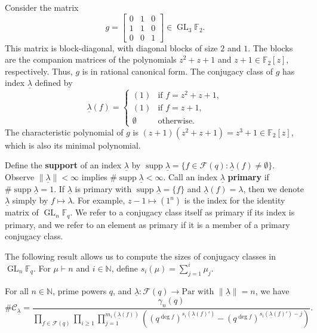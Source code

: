 \documentclass[Unicode,ALCO]{cedram}
\DeclareMathOperator{\GL}{GL}
\DeclareMathOperator{\supp}{supp}
\newcommand{\CC}{\mathcal{C}}
\newcommand{\F}{\mathbb{F}}
\newcommand{\CF}{\mathcal{F}}
\newcommand{\N}{\mathbb{N}}
\newcommand{\myemph}{\textbf}
\newcommand{\Par}{\text{Par}}
\newcommand{\ulambda}{{\underline{\lambda}}}
\begin{document}
\begin{example}
Consider the matrix
$$ g = \begin{bmatrix}
0 & 1 & 0 \\
1 & 1 & 0 \\
0 & 0 & 1
\end{bmatrix} \in \GL_3 \F_2. $$
This matrix is block-diagonal, with diagonal blocks of size $2$ and $1$. The blocks are the companion matrices of the polynomials $z^2+z+1$ and $z+1 \in \F_2[z]$, respectively.
Thus, $g$ is in rational canonical form. The conjugacy class of $g$ has index $\ulambda$ defined by
$$ \ulambda (f) = \begin{cases}
(1) & \text{if } f = z^2 + z + 1, \\
(1) & \text{if } f = z+1, \\
\emptyset & \text{otherwise.}
\end{cases} $$
The characteristic polynomial of $g$ is $(z+1)(z^2+z+1) = z^3+1 \in \F_2 [z]$, which is also its minimal polynomial.
\end{example}



Define the \myemph{support} of an index $\ulambda$ by $\supp \ulambda = \{f \in \CF (q) : \ulambda (f) \neq \emptyset\}$. Observe $\| \ulambda \| < \infty$ implies $\# \supp \ulambda  < \infty$. Call an index $\ulambda$ \myemph{primary} if $\# \supp \ulambda = 1$.
If $\ulambda$ is primary with $\supp \ulambda = \{f\}$ and $\ulambda (f) = \lambda$, then we denote $\ulambda$ simply by $f \mapsto \lambda$. For example, $z-1 \mapsto (1^n)$ is the index for the identity matrix of $\GL_n \F_q$.
We refer to a conjugacy class itself as primary if its index is primary, and we refer to an element as primary if it is a member of a primary conjugacy class.

The following result allows us to compute the sizes of conjugacy classes in \(\GL_n \F_q\).
For \(\mu \vdash n\) and \(i \in \N\), define \(s_i(\mu) = \sum_{j=1}^i \mu_j\).

\begin{theorem}[{\cite[Theorem~1.10.7]{EC1}}]
\label{cc_sizes}
For all \(n \in \N\), prime powers \(q\), and \(\ulambda : \CF (q) \to \Par\) with \(\|\ulambda \| = n\), we have
\begin{equation}
\# \CC_\ulambda
=
\frac{\gamma_n(q)}{
\prod_{f \in \CF (q)}
\prod_{i \geq 1}
\prod_{j = 1}^{m_i(\ulambda(f))}
\left (
(q^{\deg f})^{s_i(\ulambda(f)')}
-
(q^{\deg f})^{s_i(\ulambda(f)') - j}
\right ) }.
\end{equation}
\end{theorem}
\end{document}
